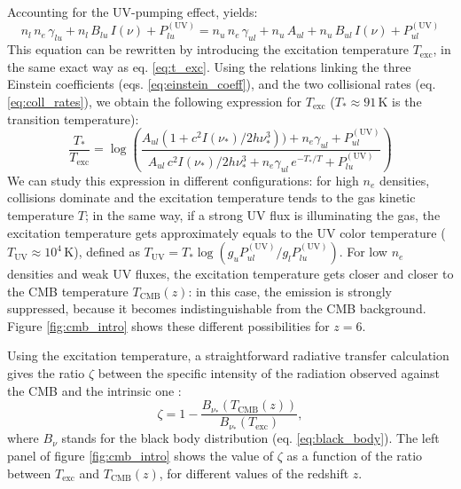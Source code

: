 Accounting for the UV-pumping effect, yields:
\begin{equation}
    n_l \,n_e\,\gamma_{lu} + n_l \,B_{lu}\, I(\nu) + P_{lu}^\mathrm{(UV)} = n_u\,n_e\,\gamma_{ul} + n_u\,A_{ul} + n_u\, B_{ul} \,I(\nu) + P_{ul}^\mathrm{(UV)}
\end{equation}
This equation can be rewritten by introducing the excitation temperature $T_\mathrm{exc}$, in the same exact way as eq. \ref{eq:t_exc}. Using the relations linking the three Einstein coefficients (eqs. \ref{eq:einstein_coeff}), and the two collisional rates (eq. \ref{eq:coll_rates}), we obtain the following expression for $T_\mathrm{exc}$ ($T_*\approx 91\,\mathrm{K}$ is the transition temperature):
\begin{equation}
    \frac{T_*}{T_\mathrm{exc}} = \log\left( \frac{A_{ul}\left(1+c^2I(\nu_*)/2h\nu_*^3\right))+n_e\gamma_{ul}+P_{ul}^\mathrm{(UV)}}{A_{ul}\,c^2I(\nu_*)/2h\nu_*^3+n_e\gamma_{ul}\,e^{-T_*/T}+P_{lu}^\mathrm{(UV)}} \right)
\end{equation}
We can study this expression in different configurations: for high $n_e$ densities, collisions dominate and the excitation temperature tends to the gas kinetic temperature $T$; in the same way, if a strong UV flux is illuminating the gas, the excitation temperature gets approximately equals to the UV color temperature ($T_\mathrm{UV}\approx 10^4\,\mathrm{K}$), defined as $T_\mathrm{UV} = T_*\log\left(g_u P_{ul}^\mathrm{(UV)}/g_l P_{lu}^\mathrm{(UV)}\right)$. For low $n_e$ densities and weak UV fluxes, the excitation temperature gets closer and closer to the CMB temperature $T_\mathrm{CMB}(z)$: in this case, the \CII emission is strongly suppressed, because it becomes indistinguishable from the CMB background. Figure \ref{fig:cmb_intro} shows these different possibilities for $z=6$.

Using the excitation temperature, a straightforward radiative transfer calculation gives the ratio $\zeta$ between the specific intensity of the radiation observed against the CMB and the intrinsic one \citep[see e.g.,][]{dacunha2013}: 
\begin{equation}
    \zeta = 1-\frac{B_{\nu_*}(T_\mathrm{CMB}(z))}{B_{\nu_*}(T_\mathrm{exc})},
    \label{eq:suppression_factor}
\end{equation}
where $B_\nu$ stands for the black body distribution (eq. \ref{eq:black_body}). The left panel of figure \ref{fig:cmb_intro} shows the value of $\zeta$ as a function of the ratio between $T_\mathrm{exc}$ and $T_\mathrm{CMB}(z)$, for different values of the redshift $z$.

